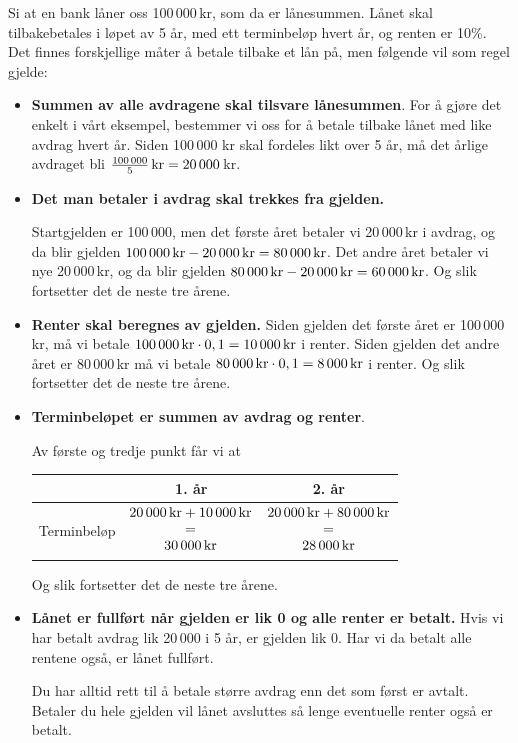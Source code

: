 Si at en bank låner  oss 100\,000\,kr, som da er lånesummen. Lånet skal tilbakebetales i løpet av 5 år, med ett terminbeløp hvert år, og renten er 10\%. Det finnes forskjellige måter å betale tilbake et lån på, men følgende vil som regel gjelde:
\begin{itemize}
	\item \textbf{Summen av alle avdragene skal tilsvare lånesummen}.\os
	 For å gjøre det enkelt i vårt eksempel, bestemmer vi oss for å betale tilbake lånet med like avdrag hvert år. Siden 100\,000 kr skal fordeles likt over 5 år, må det årlige avdraget bli $ \frac{100\,000}{5}\,\textrm{kr}=20\,000 $\,kr.
	\item \textbf{Det man betaler i avdrag skal trekkes fra gjelden.}\os
	
	Startgjelden er 100\,000, men det første året betaler vi 20\,000\,kr i avdrag, og da blir gjelden $100\,000\,\textrm{kr}-20\,000\,\textrm{kr} =80\,000\,\textrm{kr} $. Det andre året betaler vi nye 20\,000\,kr, og da blir gjelden $ 80\,000\,\textrm{kr}-20\,000\,\textrm{kr} =60\,000\,\textrm{kr}  $. Og slik fortsetter det de neste tre årene.
	\item \textbf{Renter skal beregnes av gjelden.}\os 
	Siden gjelden det første året er 100\,000\,kr, må vi betale ${ 100\,000\,\textrm{kr}\cdot0,1=10\,000\,\textrm{kr} } $ i renter. Siden gjelden det andre året er 80\,000\,kr må vi betale ${ 80\,000\,\textrm{kr}\cdot0,1=8\,000\,\textrm{kr} } $ i renter.  Og slik fortsetter det de neste tre årene.
	
	\item \textbf{Terminbeløpet er summen av avdrag og renter}.\os
	
	Av første og tredje punkt får vi at\os
	\centering
	\begin{tabular}{c| c |c}
		 & 1. år & 2. år \\ \hline
		Terminbeløp 
			& $\begin{matrix}
			20\,000\,\textrm{kr} +10\,000\,\textrm{kr}\\
			= \\
			30\,000\,\textrm{kr}
			\end{matrix} $  
				& $\begin{matrix}
					20\,000\,\textrm{kr} +80\,000\,\textrm{kr}\\
					= \\
					28\,000\,\textrm{kr}
					\end{matrix} $ 
	\end{tabular}\os
\raggedright 
Og slik fortsetter det de neste tre årene.
\item \textbf{Lånet er fullført når gjelden er lik 0 og alle renter er betalt.}\os
Hvis vi har betalt avdrag lik 20\,000 i 5 år, er gjelden lik 0. Har vi da betalt alle rentene også, er lånet fullført. \os

{\footnotesize\mer Du har alltid rett til å betale større avdrag enn det som først er avtalt. Betaler du hele gjelden vil lånet avsluttes så lenge eventuelle renter også er betalt.}
\end{itemize}\vsk
